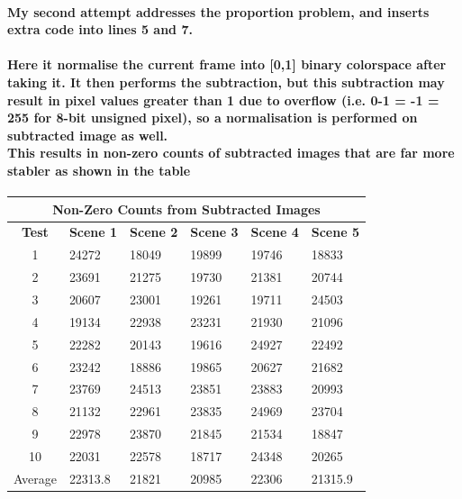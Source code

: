 \documentclass[11pt]{article} %
\begin{document}
\paragraph{My second attempt addresses the proportion problem, and inserts extra code into lines 5 and 7.}

\paragraph{Here it normalise the current frame into [0,1] binary colorspace after taking it. It then performs the subtraction, but this subtraction may result in pixel values greater than 1 due to overflow (i.e. 0-1 = -1 = 255 for 8-bit unsigned pixel), so a normalisation is performed on subtracted image as well. \\
This results in non-zero counts of subtracted images that are far more stabler as shown in the table}
\begin{center}
\begin{table}
	\begin{tabular}{| c | l | l | l | l | l | }
\hline
\multicolumn{6}{|c|}{\bf Non-Zero Counts from Subtracted Images} \\
\hline
\bf Test	&\bf Scene 1	&\bf Scene 2	&\bf Scene 3	&\bf Scene 4	&\bf Scene 5	\\ \hline
1	&24272	&18049	&19899	&19746	&18833\\
2	&23691	&21275	&19730	&21381	&20744\\
3	&20607	&23001	&19261	&19711	&24503\\
4	&19134	&22938	&23231	&21930	&21096\\
5	&22282	&20143	&19616	&24927	&22492\\
6	&23242	&18886	&19865	&20627	&21682\\
7	&23769	&24513	&23851	&23883	&20993\\
8	&21132	&22961	&23835	&24969	&23704\\
9	&22978	&23870	&21845	&21534	&18847\\
10	&22031	&22578	&18717	&24348	&20265\\ \hline
Average	&22313.8	&21821	&20985	&22306	&21315.9	\\ \hline
	\end{tabular}
	\label{tab:sub2}
\end{table}
\end{center}
\end{document}
